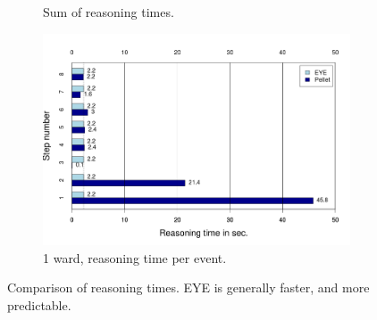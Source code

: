 \begin{figure}
\begin{subfigure}{.4\textwidth}
{    }
  \caption{Sum of reasoning times.}
  \label{fig:summary}
\end{subfigure}%
\begin{subfigure}{.6\textwidth}
  \centering
  \includegraphics[width=\linewidth]{Rplot14.png}
  \caption{1 ward, reasoning time per event.}
  \label{fig:results1ward}
\end{subfigure}
\caption{Comparison of reasoning times. EYE is generally faster, and more predictable.}
\label{figure:result}
\end{figure} 
  
  
  
%    
  
  
 
  

  
  
	


